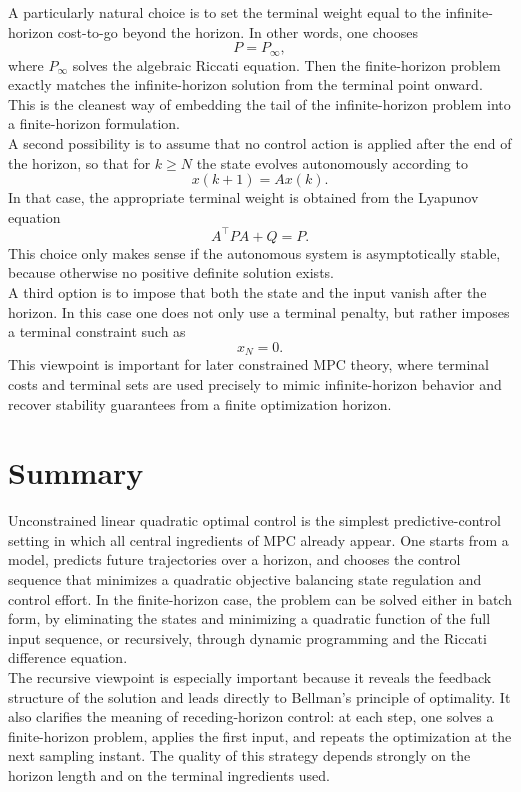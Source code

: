A particularly natural choice is to set the terminal weight equal to the infinite-horizon cost-to-go beyond the horizon. In other words, one chooses
\[
P=P_\infty,
\]
where $P_\infty$ solves the algebraic Riccati equation. Then the finite-horizon problem exactly matches the infinite-horizon solution from the terminal point onward. This is the cleanest way of embedding the tail of the infinite-horizon problem into a finite-horizon formulation.\\

A second possibility is to assume that no control action is applied after the end of the horizon, so that for $k\geq N$ the state evolves autonomously according to
\[
x(k+1)=Ax(k).
\]
In that case, the appropriate terminal weight is obtained from the Lyapunov equation
\[
A^\top P A + Q = P.
\]
This choice only makes sense if the autonomous system is asymptotically stable, because otherwise no positive definite solution exists.\\

A third option is to impose that both the state and the input vanish after the horizon. In this case one does not only use a terminal penalty, but rather imposes a terminal constraint such as
\[
x_N=0.
\]
This viewpoint is important for later constrained MPC theory, where terminal costs and terminal sets are used precisely to mimic infinite-horizon behavior and recover stability guarantees from a finite optimization horizon.

\section{Summary}

Unconstrained linear quadratic optimal control is the simplest predictive-control setting in which all central ingredients of MPC already appear. One starts from a model, predicts future trajectories over a horizon, and chooses the control sequence that minimizes a quadratic objective balancing state regulation and control effort. In the finite-horizon case, the problem can be solved either in batch form, by eliminating the states and minimizing a quadratic function of the full input sequence, or recursively, through dynamic programming and the Riccati difference equation.\\

The recursive viewpoint is especially important because it reveals the feedback structure of the solution and leads directly to Bellman’s principle of optimality. It also clarifies the meaning of receding-horizon control: at each step, one solves a finite-horizon problem, applies the first input, and repeats the optimization at the next sampling instant. The quality of this strategy depends strongly on the horizon length and on the terminal ingredients used.\\

